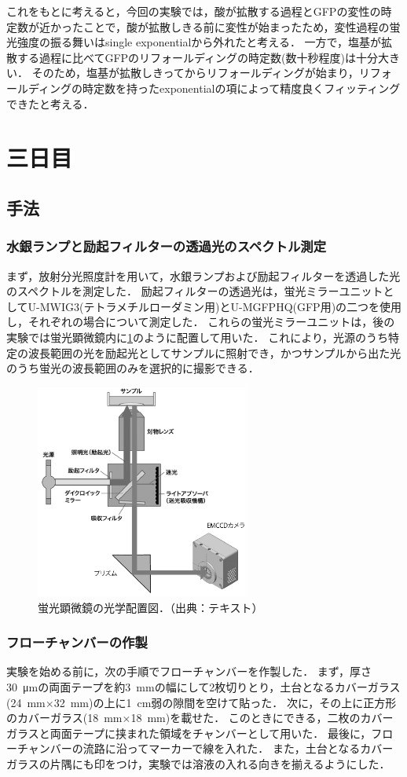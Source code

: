 \documentclass[a4paper,11pt, titlepage]{jsarticle}
\begin{document}
これをもとに考えると，今回の実験では，酸が拡散する過程とGFPの変性の時定数が近かったことで，酸が拡散しきる前に変性が始まったため，変性過程の蛍光強度の振る舞いはsingle exponentialから外れたと考える．
一方で，塩基が拡散する過程に比べてGFPのリフォールディングの時定数(数十秒程度)は十分大きい．
そのため，塩基が拡散しきってからリフォールディングが始まり，リフォールディングの時定数を持ったexponentialの項によって精度良くフィッティングできたと考える．

\section{三日目}
\subsection{手法}
\subsubsection{水銀ランプと励起フィルターの透過光のスペクトル測定}
まず，放射分光照度計を用いて，水銀ランプおよび励起フィルターを透過した光のスペクトルを測定した．
励起フィルターの透過光は，蛍光ミラーユニットとしてU-MWIG3(テトラメチルローダミン用)とU-MGFPHQ(GFP用)の二つを使用し，それぞれの場合について測定した．
これらの蛍光ミラーユニットは，後の実験では蛍光顕微鏡内に\ref{fig:scope}のように配置して用いた．
これにより，光源のうち特定の波長範囲の光を励起光としてサンプルに照射でき，かつサンプルから出た光のうち蛍光の波長範囲のみを選択的に撮影できる．

\begin{figure}[htbp]
    \centering
    \includegraphics[width=7cm]{scope.png}
    \caption{蛍光顕微鏡の光学配置図．（出典：テキスト\cite{text}）}
    \label{fig:scope}
\end{figure}

\subsubsection{フローチャンバーの作製}
実験を始める前に，次の手順でフローチャンバーを作製した．
まず，厚さ\SI{30}{\um}の両面テープを約\SI{3}{\mm}の幅にして2枚切りとり，土台となるカバーガラス(\SI{24}{\mm}$\times$\SI{32}{\mm})の上に\SI{1}{\cm}弱の隙間を空けて貼った．
次に，その上に正方形のカバーガラス(\SI{18}{\mm}$\times$\SI{18}{\mm})を載せた．
このときにできる，二枚のカバーガラスと両面テープに挟まれた領域をチャンバーとして用いた．
最後に，フローチャンバーの流路に沿ってマーカーで線を入れた．
また，土台となるカバーガラスの片隅にも印をつけ，実験では溶液の入れる向きを揃えるようにした．
\end{document}
